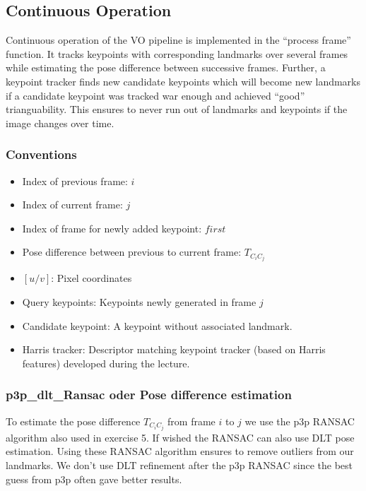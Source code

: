 \subsection{Continuous Operation}
\label{sec_cont_op}
Continuous operation of the VO pipeline is implemented in the ``process frame'' function. It tracks keypoints with corresponding landmarks over several frames while estimating the pose difference between successive frames. Further, a keypoint tracker finds new candidate keypoints which will become new landmarks if a candidate keypoint was tracked war enough and achieved ``good'' trianguability. This ensures to never run out of landmarks and keypoints if the image changes over time.

\subsubsection{Conventions}
\begin{itemize}
	\item Index of previous frame: $i$
	\item Index of current frame: $j$
	\item Index of frame for newly added keypoint: $first$
	\item Pose difference between previous to current frame: $T_{C_iC_j}$
	\item $\left[u/v\right]$: Pixel coordinates
	\item Query keypoints: Keypoints newly generated in frame $j$ 
	\item Candidate keypoint: A keypoint without associated landmark.
	\item Harris tracker: Descriptor matching keypoint tracker (based on Harris features) developed during the lecture.
\end{itemize}

\subsubsection{p3p\_dlt\_Ransac oder Pose difference estimation}
To estimate the pose difference $T_{C_iC_j}$ from frame $i$ to $j$ we use the p3p RANSAC algorithm also used in exercise 5. If wished the RANSAC can also use DLT pose estimation. Using these RANSAC algorithm ensures to remove outliers from our landmarks. We don't use DLT refinement after the p3p RANSAC since the best guess from p3p often gave better results.

